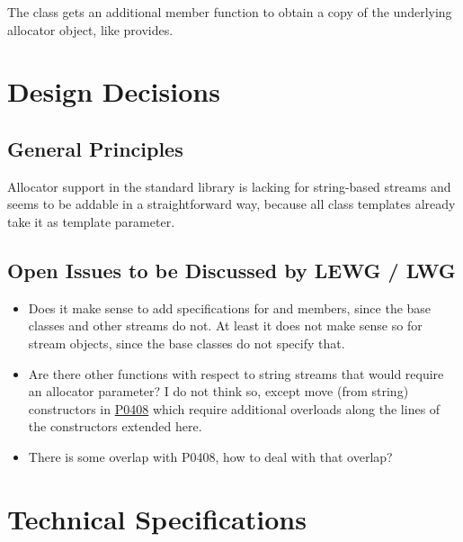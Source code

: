\documentclass[ebook,11pt,article]{memoir}
\begin{document}
The class  gets an additional member function to obtain a copy of the underlying allocator object, like  provides.

\chapter{Design Decisions}
\section{General Principles}
Allocator support in the standard library is lacking for string-based streams and seems to be addable in a straightforward way, because all class templates already take it as template parameter.
\section{Open Issues to be Discussed by LEWG / LWG}
\begin{itemize}
\item Does it make sense to add  specifications for  and  members, since the base classes and other streams do not. At least it does not make sense so for stream objects, since the base classes do not specify that.
\item Are there other functions with respect to string streams that would require an allocator parameter? I do not think so, except move (from string) constructors in \href{https://wg21.link/P0408}{P0408} which require additional overloads along the lines of the constructors extended here.
\item There is some overlap with P0408, how to deal with that overlap?
\end{itemize}

\chapter{Technical Specifications}
\end{document}

